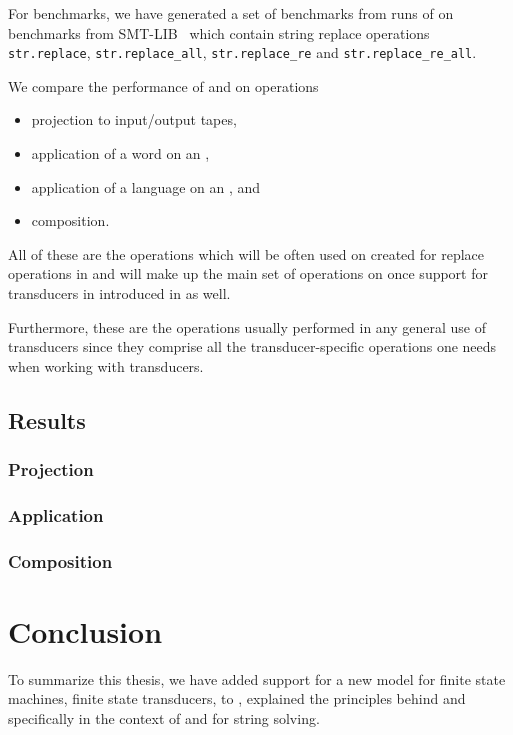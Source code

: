 For benchmarks, we have generated a set of benchmarks from runs of \noodler on benchmarks from SMT-LIB~\cite{SMTLIB} which contain string replace operations \texttt{str.replace}, \texttt{str.replace\_all}, \texttt{str.replace\_re} and \texttt{str.replace\_re\_all}.

We compare the performance of \mata and \mona on operations
\begin{itemize}
  \item projection to input/output tapes,
  \item application of a word on an \nft,
  \item application of a language on an \nft, and
  \item composition.
\end{itemize}

All of these are the operations which will be often used on \nfts created for replace operations in \noodler and will make up the main set of operations on \nfts once support for transducers in introduced in \noodler as well.

Furthermore, these are the operations usually performed in any general use of transducers since they comprise all the transducer-specific operations one needs when working with transducers.

\section{Results}

\subsection{Projection}

\subsection{Application}

\subsection{Composition}

\chapter{Conclusion}

To summarize this thesis, we have added support for a new model for finite state machines, finite state transducers, to \mata, explained the principles behind \nfts and specifically \nfts in the context of \mata and \noodler for string solving.

